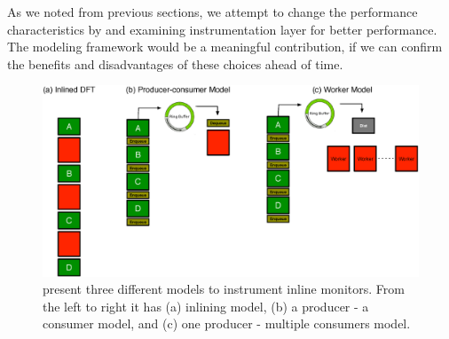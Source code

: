 As we noted from previous sections, we attempt to change the performance
characteristics by \sreplica and examining instrumentation layer for better
performance. The modeling framework would be a meaningful contribution, if we
can confirm the benefits and disadvantages of these choices ahead of time.
 
\begin{figure}[tb]
    \centering
    \includegraphics[width=0.90\linewidth]{figs/model0.eps}

    \caption{present three different models to instrument inline monitors. From
    the left to right it has (a) inlining model, (b) a producer - a consumer
    model, and (c) one producer - multiple consumers model.\label{fig:model0}}

\end{figure}


